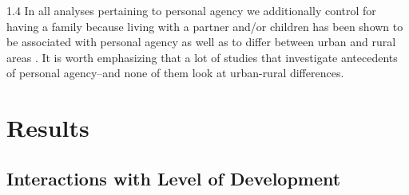 \documentclass[10pt, letterpaper]{article}
\begin{document}
\begin{spacing}{1.4}
 In all analyses pertaining to personal agency we additionally control for having a family because living with a partner and/or children has been shown to be associated with personal agency  \citep[e.g.,][]{nikolaev2016give,steckermeier2024,symoensetal2014} as well as to differ between urban and rural areas
 \citep[e.g.,][]{gautieretal2010,stockdale2014life}.
%
It is worth emphasizing that a lot of studies that investigate antecedents of
personal agency--and none of them look at urban-rural differences.
% 
%


\section{Results}
\subsection{Interactions with Level of Development}


\end{spacing}
\end{document}

